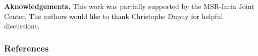 \documentclass{article}
\newcommand{\emp}[1]{\textbf{#1}}
\begin{document}
\emp{Aknowledgements.} This work was partially supported by the MSR-Inria Joint Center. The authors would like to thank Christophe Dupuy for helpful discussions.
























\subsubsection*{References}
\renewcommand\refname{\vspace{-2em}}

{\small}
\end{document}
